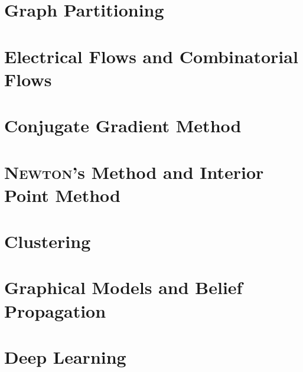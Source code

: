 \chapter{Graph Partitioning}
    
    
\chapter{Electrical Flows and Combinatorial Flows}
\chapter{Conjugate Gradient Method}
\chapter{\textsc{Newton}'s Method and Interior Point Method}
\chapter{Clustering}
\chapter{Graphical Models and Belief Propagation}
\chapter{Deep Learning}
    



\nocite{*}







